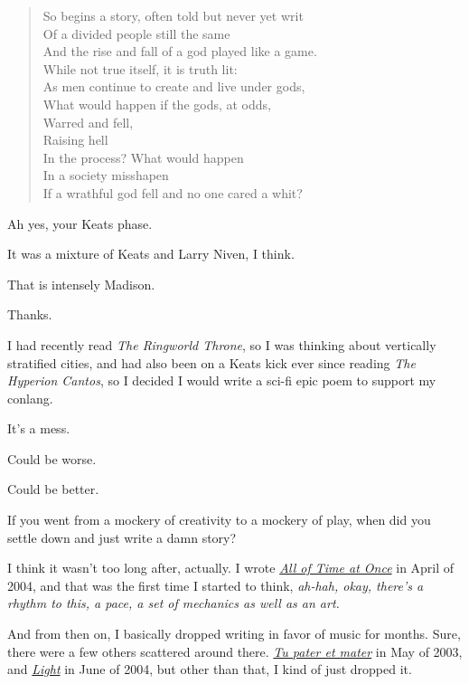 \begin{leftcolumn}
\begin{verse}
So begins a story, often told but never yet writ\\
\vin Of a divided people still the same\\
\vin And the rise and fall of a god played like a game.\\
While not true itself, it is truth lit:\\
\vin As men continue to create and live under gods,\\
\vin What would happen if the gods, at odds,\\
\vin \vin Warred and fell,\\
\vin \vin Raising hell\\
\vin In the process? What would happen\\
\vin In a society misshapen\\
If a wrathful god fell and no one cared a whit?
\end{verse}

\begin{ally}
Ah yes, your Keats phase.
\end{ally}
It was a mixture of Keats and Larry Niven, I think.

\begin{ally}
That is intensely Madison.
\end{ally}
Thanks.

I had recently read \emph{The Ringworld Throne}, so I was thinking about vertically stratified cities, and had also been on a Keats kick ever since reading \emph{The Hyperion Cantos}, so I decided I would write a sci-fi epic poem to support my conlang.

It's a mess.

\begin{ally}
Could be worse.
\end{ally}
Could be better.
\newpage

\begin{ally}
If you went from a mockery of creativity to a mockery of play, when did you settle down and just write a damn story?
\end{ally}
I think it wasn't too long after, actually. I wrote \href{https://writing.drab-makyo.com/fiction/all-of-time-at-once/}{\emph{All of Time at Once}} in April of 2004, and that was the first time I started to think, \emph{ah-hah, okay, there's a rhythm to this, a pace, a set of mechanics as well as an art.}

And from then on, I basically dropped writing in favor of music for months. Sure, there were a few others scattered around there. \href{https://writing.drab-makyo.com/fiction/tu-pater-et-mater/}{\emph{Tu pater et mater}} in May of 2003, and \href{https://writing.drab-makyo.com/fiction/light/}{\emph{Light}} in June of 2004, but other than that, I kind of just dropped it.


\end{leftcolumn}

